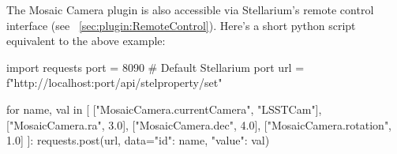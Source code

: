The Mosaic Camera plugin is also accessible via Stellarium's remote control interface (see ~\ref{sec:plugin:RemoteControl}).
Here's a short python script equivalent to the above example:

\begin{script}
  import requests
  port = 8090  # Default Stellarium port
  url = f"http://localhost:{port}/api/stelproperty/set"

  for name, val in [
    ["MosaicCamera.currentCamera", "LSSTCam"],
    ["MosaicCamera.ra", 3.0],
    ["MosaicCamera.dec", 4.0],
    ["MosaicCamera.rotation", 1.0]
  ]:
    requests.post(url, data={"id": name, "value": val})
\end{script}




